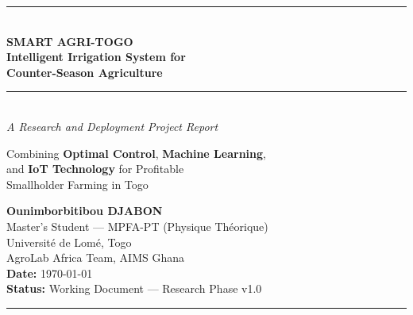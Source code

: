 \documentclass[12pt, a4paper]{report}
\begin{document}
\begin{titlepage}

\vspace*{0.5cm}
\begin{center}
  {\color{agrigreen}\rule{\linewidth}{2pt}}\\[0.3cm]
  {\Huge\bfseries\color{agrigreen!80!black}
    SMART AGRI-TOGO}\\[0.4cm]
  {\LARGE\bfseries Intelligent Irrigation System for\\
   Counter-Season Agriculture}\\[0.3cm]
  {\color{agrigreen}\rule{\linewidth}{1pt}}\\[0.8cm]

  {\large\textit{A Research and Deployment Project Report}}\\[1.2cm]

  \begin{tcolorbox}[colback=agrigreen!10, colframe=agrigreen!80, width=0.85\textwidth,
    arc=6pt, boxrule=1pt]
  \centering
  {\large Combining \textbf{Optimal Control}, \textbf{Machine Learning},\\
  and \textbf{IoT Technology} for Profitable\\
  Smallholder Farming in Togo}
  \end{tcolorbox}

  \vspace{1.5cm}
  {\Large\bfseries Ounimborbitibou DJABON}\\[0.3cm]
  {\normalsize Master's Student — MPFA-PT (Physique Théorique)\\
   Université de Lomé, Togo\\[0.2cm]
   AgroLab Africa Team, AIMS Ghana}\\[1.2cm]

  {\normalsize\color{darkgray}
   \textbf{Date:} \today\\[0.2cm]
   \textbf{Status:} Working Document — Research Phase v1.0}

  \vspace{2cm}
  {\color{agrigreen}\rule{\linewidth}{1pt}}
\end{center}
\end{titlepage}
\end{document}
